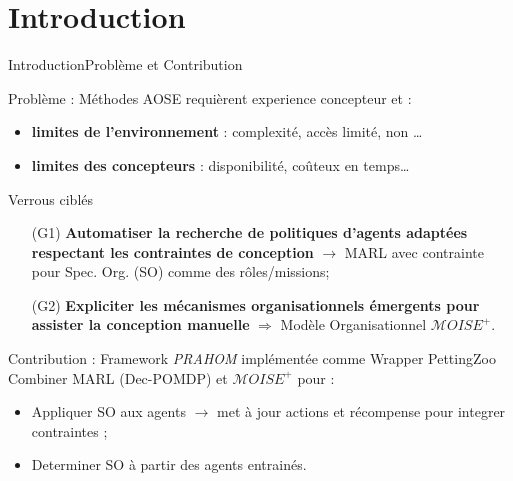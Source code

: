 

\addtocounter{framenumber}{-1}

\section{Introduction}

\begin{frame}{Introduction}{Problème et Contribution}


    \begin{alertblock}{Problème : Méthodes AOSE requièrent experience concepteur et  :}
        \begin{itemize}
            \item \textbf{limites de l'environnement} : complexité, accès limité, non \dots
            \item \textbf{limites des concepteurs} : disponibilité, coûteux en temps\dots
        \end{itemize}
    \end{alertblock}

    \begin{block}{Verrous ciblés}
        \begin{enumerate}
            \item[\phantom{X} (G1)] \textbf{Automatiser la recherche de politiques d'agents adaptées respectant les contraintes de conception} $\rightarrow$ MARL avec contrainte pour Spec. Org. (SO) comme des rôles/missions;
            \item[\phantom{X} (G2)] \textbf{Expliciter les mécanismes organisationnels émergents pour assister la conception manuelle} $\Longrightarrow$ Modèle Organisationnel $\mathcal{M}OISE^+$.
        \end{enumerate}
    \end{block}

    \begin{exampleblock}{Contribution : Framework \textit{PRAHOM} implémentée comme Wrapper PettingZoo~\parencite{soule2024}}
        Combiner MARL (Dec-POMDP) et $\mathcal{M}OISE^+$ pour :
        \begin{itemize}
            \item Appliquer SO aux agents $\rightarrow$ met à jour actions et récompense pour integrer contraintes ;
            \item Determiner SO  à partir des agents entrainés.
        \end{itemize}
    \end{exampleblock}

\end{frame}
